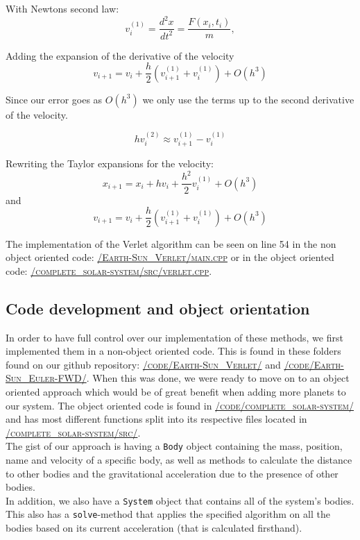 \documentclass[../main.tex]{subfiles}
\begin{document}
With Newtons second law:
$$v_i^{(1)} = \frac{d^2x}{dt^2} = \frac{F(x_i, t_i)}{m},$$

Adding the expansion of the derivative of the velocity
$$v_{i+1} = v_i + \frac{h}{2}\left(v_{i+1}^{(1)} + v_i^{(1)}\right) + O(h^3)$$

Since our error goes as $O(h^3)$ we only use the terms up to the second derivative of the velocity.

$$hv_i^{(2)}\approx v_{i+1}^{(1)} - v_i^{(1)}$$

Rewriting the Taylor expansions for the velocity:
$$x_{i+1} = x_i + hv_i + \frac{h^2}{2} v_i^{(1)} + O(h^3)$$
and
$$v_{i+1} = v_i + \frac{h}{2} \left(v_{i+1}^{(1)} + v_i^{(1)}\right) + O(h^3)$$

The implementation of the Verlet algorithm can be seen on line 54 in the non object oriented code: \href{https://github.com/kmaasrud/Project-5/blob/master/code/Earth-Sun_Verlet/main.cpp}{\textsc{/Earth-Sun\_Verlet/main.cpp}} or in the object oriented code: \href{https://github.com/kmaasrud/Project-5/blob/master/code/complete_solar-system/src/verlet.cpp}{\textsc{/complete\_solar-system/src/verlet.cpp}}.


\subsection{Code development and object orientation}
In order to have full control over our implementation of these methods, we first implemented them in a non-object oriented code. This is found in these folders found on our github repository\cite{repository}: \href{https://github.com/kmaasrud/Project-5/blob/master/code/Earth-Sun_Verlet/}{\textsc{/code/Earth-Sun\_Verlet/}} and \href{https://github.com/kmaasrud/Project-5/blob/master/code/Earth-Sun_Euler-FWD/}{\textsc{/code/Earth-Sun\_Euler-FWD/}}. When this was done, we were ready to move on to an object oriented approach which would be of great benefit when adding more planets to our system.
The object oriented code is found in \href{https://github.com/kmaasrud/Project-5/blob/master/code/complete_solar-system/}{\textsc{/code/complete\_solar-system/}} and has most different functions split into its respective files located in \href{https://github.com/kmaasrud/Project-5/blob/master/code/complete_solar-system/src/}{\textsc{/complete\_solar-system/src/}}. \\
The gist of our approach is having a \verb+Body+ object containing the mass, position, name and velocity of a specific body, as well as methods to calculate the distance to other bodies and the gravitational acceleration due to the presence of other bodies. \\
In addition, we also have a \verb+System+ object that contains all of the system's bodies. This also has a \verb+solve+-method that applies the specified algorithm on all the bodies based on its current acceleration (that is calculated firsthand). \\
\end{document}
